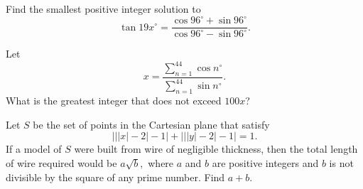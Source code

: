 %	












\begin{question}[name={1996 AIME, \href{https://artofproblemsolving.com/community/c4p394244}{Problem 10}}]
	Find the smallest positive integer solution to $$\tan 19x^\circ=\frac{\cos 96^\circ+\sin 96^\circ}{\cos 96^\circ-\sin 96^\circ}.$$
\end{question}


%	












\begin{question}[name={1997 AIME, \href{https://artofproblemsolving.com/community/c4p393654}{Problem 11}}]
	Let $$x=\frac{\displaystyle\sum_{n=1}^{44} \cos n^\circ}{\displaystyle \sum_{n=1}^{44} \sin n^\circ}.$$ What is the greatest integer that does not exceed $100x$?
\end{question}


%	













\begin{question}[name={1997 AIME, \href{https://artofproblemsolving.com/community/c4p393657}{Problem 13}}]
	Let $ S$ be the set of points in the Cartesian plane that satisfy
	\[ \Big|\big|{|x| - 2}\big| - 1\Big| + \Big|\big|{|y| - 2}\big| - 1\Big| = 1.
	\]
	If a model of $ S$ were built from wire of negligible thickness, then the total length of wire required would be $ a\sqrt {b},$ where $ a$ and $ b$ are positive integers and $ b$ is not divisible by the square of any prime number. Find $ a + b.$
\end{question}


